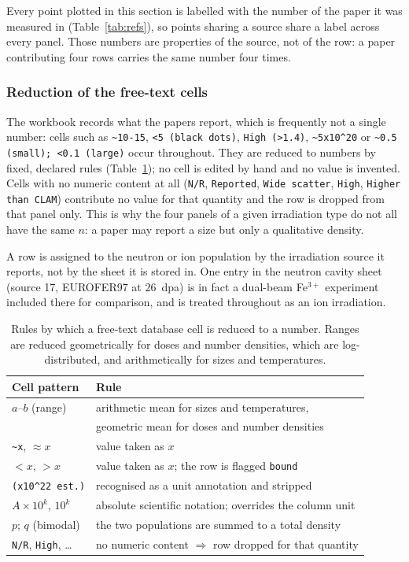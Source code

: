 Every point plotted in this section is labelled with the number of the paper it
was measured in (Table~\ref{tab:refs}), so points sharing a source share a label
across every panel. Those numbers are properties of the source, not of the row:
a paper contributing four rows carries the same number four times.

\subsubsection*{Reduction of the free-text cells}

The workbook records what the papers report, which is frequently not a single
number: cells such as \verb|~10-15|, \verb|<5 (black dots)|, \verb|High (>1.4)|,
\verb|~5x10^20| or \verb|~0.5 (small); <0.1 (large)| occur throughout. They are
reduced to numbers by fixed, declared rules (Table~\ref{tab:parse}); no cell is
edited by hand and no value is invented. Cells with no numeric content at all
(\texttt{N/R}, \texttt{Reported}, \texttt{Wide scatter}, \texttt{High},
\texttt{Higher than CLAM}) contribute no value for that quantity and the row is
dropped from that panel only. This is why the four panels of a given irradiation
type do not all have the same $n$: a paper may report a size but only a
qualitative density.

A row is assigned to the neutron or ion population by the irradiation source it
reports, not by the sheet it is stored in. One entry in the neutron cavity sheet
(source 17, EUROFER97 at $26$~dpa) is in fact a dual-beam Fe$^{3+}$ experiment
included there for comparison, and is treated throughout as an ion irradiation.

\begin{table}[htbp]
\centering
\caption{Rules by which a free-text database cell is reduced to a number.
Ranges are reduced geometrically for doses and number densities, which are
log-distributed, and arithmetically for sizes and temperatures.}
\label{tab:parse}
\begin{tabular}{ll}
\toprule
Cell pattern & Rule \\
\midrule
$a$--$b$ (range)               & arithmetic mean for sizes and temperatures, \\
                               & geometric mean for doses and number densities \\
\verb|~x|, $\approx x$         & value taken as $x$ \\
$<x$, $>x$                     & value taken as $x$; the row is flagged \texttt{bound} \\
\verb|(x10^22 est.)|           & recognised as a unit annotation and stripped \\
$A\times10^{k}$, $10^{k}$      & absolute scientific notation; overrides the column unit \\
$p$; $q$ (bimodal)             & the two populations are summed to a total density \\
\texttt{N/R}, \texttt{High}, \dots & no numeric content $\Rightarrow$ row dropped for that quantity \\
\bottomrule
\end{tabular}
\end{table}


